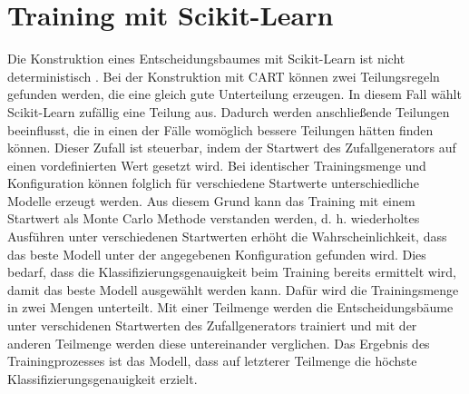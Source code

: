 \section{Training mit Scikit-Learn}
Die Konstruktion eines Entscheidungsbaumes mit Scikit-Learn ist nicht deterministisch \cite{dymelThesis}.
Bei der Konstruktion mit CART können zwei Teilungsregeln gefunden werden, die eine gleich gute Unterteilung erzeugen.
In diesem Fall wählt Scikit-Learn zufällig eine Teilung aus.
Dadurch werden anschließende Teilungen beeinflusst, die in einen der Fälle womöglich bessere Teilungen hätten finden können.
Dieser Zufall ist steuerbar, indem der Startwert des Zufallgenerators auf einen vordefinierten Wert gesetzt wird.
\newline
\newline
Bei identischer Trainingsmenge und Konfiguration können folglich für verschiedene Startwerte unterschiedliche Modelle erzeugt werden.
Aus diesem Grund kann das Training mit einem Startwert als Monte Carlo Methode verstanden werden, d. h. wiederholtes Ausführen unter verschiedenen Startwerten erhöht die Wahrscheinlichkeit, dass das
beste Modell unter der angegebenen Konfiguration gefunden wird.
\newline
\newline
Dies bedarf, dass die Klassifizierungsgenauigkeit beim Training bereits ermittelt wird, damit das beste Modell ausgewählt werden kann.
Dafür wird die Trainingsmenge in zwei Mengen unterteilt. Mit einer Teilmenge werden die Entscheidungsbäume unter verschidenen Startwerten des Zufallgenerators trainiert und
mit der anderen Teilmenge werden diese untereinander verglichen. Das Ergebnis des Trainingprozesses ist das Modell, dass auf letzterer Teilmenge die höchste
Klassifizierungsgenauigkeit erzielt.